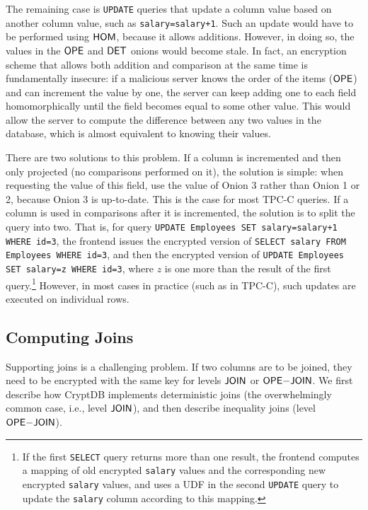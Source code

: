 The remaining case is {\tt UPDATE} queries that update a column value
based on another column value, such as {\tt salary=salary+1}.
Such an update would have to be performed using $\mathsf{HOM}$, because it
allows additions.  However, in doing so, the values in the $\mathsf{OPE}$ and
$\mathsf{DET}$ onions would become stale.  In fact, an encryption scheme that
allows both addition and comparison at the same time is fundamentally
insecure: if a malicious server knows the order of the items ($\mathsf{OPE}$)
and can increment the value by one, the server can keep adding one to
each field homomorphically until the field becomes equal to some other
value.  This would allow the server to compute the difference between
any two values in the database, which is almost equivalent to knowing
their values. 

There are two solutions to this problem.
If a column is incremented and then only projected (no comparisons
performed on it), the solution is simple: when requesting the value
of this field, use the value of Onion 3 rather than Onion 1 or 2,
because Onion 3 is up-to-date.
This is the case for most TPC-C queries.
If a column is used in comparisons after it is incremented, the
solution is to split the query into two.
That is, for query \texttt{UPDATE Employees SET salary=salary+1
WHERE id=3}, the frontend issues the encrypted version of
\texttt{SELECT salary FROM Employees WHERE id=3}, and then
the encrypted version of
\texttt{UPDATE Employees SET salary=z WHERE id=3}, where
$z$ is one more than the result of the first
query.\footnote{If the first {\tt SELECT} query returns more than
one result, the frontend computes a mapping of old encrypted
{\tt salary} values and the corresponding new encrypted {\tt salary}
values, and uses a UDF in the second {\tt UPDATE} query to update
the {\tt salary} column according to this mapping.}
However, in most cases in practice (such as in TPC-C), such updates
are executed on individual rows.

\subsection{Computing Joins}
\label{ss:join}
 
Supporting joins is a challenging problem.  If two columns are to be
joined, they need to be encrypted with the same key for levels
$\mathsf{JOIN}$ or $\mathsf{OPE}\mathrm{-}\mathsf{JOIN}$.  We first describe how CryptDB implements
deterministic joins (the overwhelmingly common case, i.e., level
$\mathsf{JOIN}$), and then describe inequality joins (level $\mathsf{OPE}\mathrm{-}\mathsf{JOIN}$).

